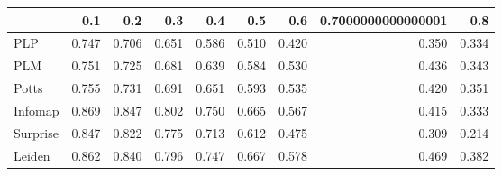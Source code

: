 \begin{tabular}{lrrrrrrrr}
\toprule
{} &   0.1 &   0.2 &   0.3 &   0.4 &   0.5 &   0.6 & 0.7000000000000001 &   0.8 \\
\midrule
PLP      & 0.747 & 0.706 & 0.651 & 0.586 & 0.510 & 0.420 &              0.350 & 0.334 \\
PLM      & 0.751 & 0.725 & 0.681 & 0.639 & 0.584 & 0.530 &              0.436 & 0.343 \\
Potts    & 0.755 & 0.731 & 0.691 & 0.651 & 0.593 & 0.535 &              0.420 & 0.351 \\
Infomap  & 0.869 & 0.847 & 0.802 & 0.750 & 0.665 & 0.567 &              0.415 & 0.333 \\
Surprise & 0.847 & 0.822 & 0.775 & 0.713 & 0.612 & 0.475 &              0.309 & 0.214 \\
Leiden   & 0.862 & 0.840 & 0.796 & 0.747 & 0.667 & 0.578 &              0.469 & 0.382 \\
\bottomrule
\end{tabular}
